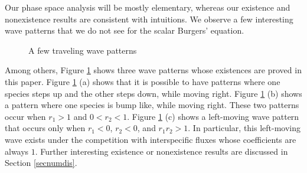 \documentclass{amsart}
\def\blue{\color{blue}}
\theoremstyle{definition}
\numberwithin{equation}{section}
\begin{document}
Our phase space analysis will be mostly elementary, whereas our existence and nonexistence results are consistent with intuitions. We observe a few interesting wave patterns that we do not see for the scalar Burgers' equation. 
\begin{figure}[ht]
\setcounter{subfigure}{0}
\caption{A few traveling wave patterns } \label{figintro}
\end{figure}
Among others, Figure \ref{figintro} shows three wave patterns whose existences are proved in this paper. Figure \ref{figintro} (a) shows that it is possible to have patterns where one species steps up and the other steps down, while moving right. Figure \ref{figintro} (b) shows a pattern where one species is bump like, while moving right. These two patterns occur when $r_1>1$ and $0<r_2<1$. Figure \ref{figintro} (c) shows a left-moving wave pattern that occurs only when $r_1<0$, $r_2<0$, and $r_1r_2>1$. In particular, this left-moving wave exists under the competition with interspecific fluxes whose coefficients are always $1$. Further interesting existence or nonexistence results are discussed in Section \ref{secnumdis}.
% 
% 
% 
% 
% 
% 
% 
% 
% 
% 
% 
% 
% 
% 
% 
\end{document}
